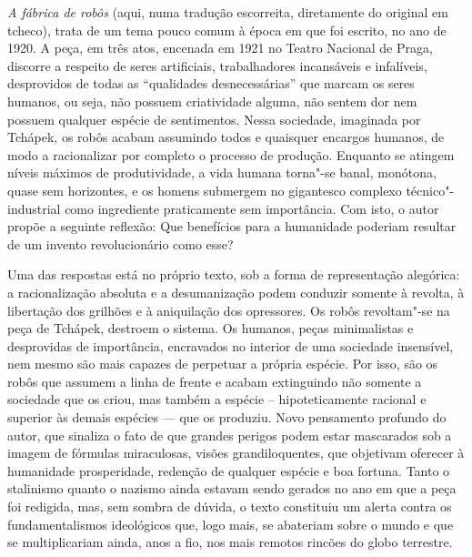 \textit{A fábrica de robôs} (aqui, numa tradução escorreita, diretamente do original
em tcheco), trata de um tema pouco comum à época em que foi escrito, no ano de
1920. A peça, em três atos, encenada em 1921 no Teatro Nacional de Praga,
discorre a respeito de seres artificiais, trabalhadores incansáveis e
infalíveis, desprovidos de todas as “qualidades desnecessárias” que marcam os
seres humanos, ou seja, não possuem criatividade alguma, não sentem dor nem
possuem qualquer espécie de sentimentos. Nessa sociedade, imaginada por Tchápek,
os robôs acabam assumindo todos e quaisquer encargos humanos, de modo a
racionalizar por completo o processo de produção. Enquanto se atingem níveis
máximos de produtividade, a vida humana torna"-se banal, monótona, quase sem
horizontes, e os homens submergem no gigantesco complexo técnico"-industrial
como ingrediente praticamente sem importância. Com isto, o autor propõe a
seguinte reflexão: Que benefícios para a humanidade poderiam resultar de um
invento revolucionário como esse? 

Uma das respostas está no próprio texto, sob a forma de representação
alegórica: a racionalização absoluta e a desumanização podem conduzir somente à
revolta, à libertação dos grilhões e à aniquilação dos opressores. Os robôs
revoltam"-se na peça de Tchápek, destroem o sistema. Os humanos, peças
minimalistas e desprovidas de importância, encravados no interior de uma
sociedade insensível, nem mesmo são mais capazes de perpetuar a própria
espécie. Por isso, são os robôs que assumem a linha de frente e acabam
extinguindo não somente a sociedade que os criou, mas também a espécie –
hipoteticamente racional e superior às demais espécies --- que os produziu. Novo
pensamento profundo do autor, que sinaliza o fato de que grandes perigos podem
estar mascarados sob a imagem de fórmulas miraculosas, visões grandiloquentes,
que objetivam oferecer à humanidade prosperidade, redenção de qualquer espécie
e boa fortuna. Tanto o stalinismo quanto o nazismo ainda estavam sendo gerados
no ano em que a peça foi redigida, mas, sem sombra de dúvida, o texto
constituiu um alerta contra os fundamentalismos ideológicos que, logo mais, se
abateriam sobre o mundo e que se multiplicariam ainda, anos a fio, nos mais
remotos rincões do globo terrestre.

